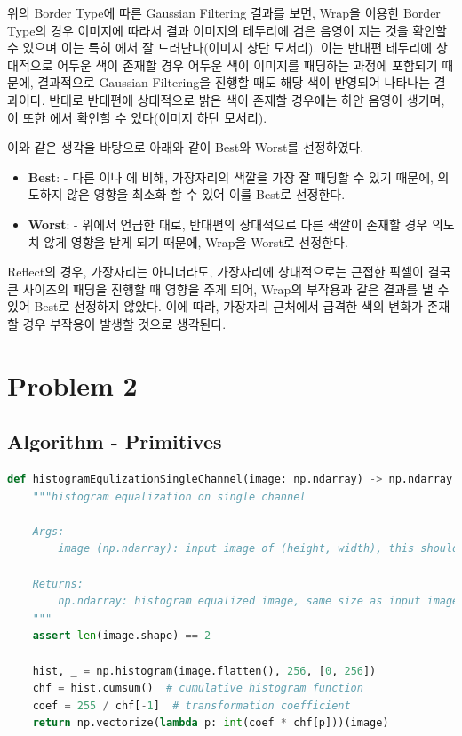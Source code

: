 \documentclass{report}
\begin{document}
위의 Border Type에 따른 Gaussian Filtering 결과를 보면, Wrap을 이용한 Border Type의 경우 이미지에 따라서 결과 이미지의 테두리에 검은 음영이 지는 것을 확인할 수 있으며 이는 특히 에서 잘 드러난다(이미지 상단 모서리).
이는 반대편 테두리에 상대적으로 어두운 색이 존재할 경우 어두운 색이 이미지를 패딩하는 과정에 포함되기 때문에, 결과적으로 Gaussian Filtering을 진행할 때도 해당 색이 반영되어 나타나는 결과이다.
반대로 반대편에 상대적으로 밝은 색이 존재할 경우에는 하얀 음영이 생기며, 이 또한 에서 확인할 수 있다(이미지 하단 모서리).

이와 같은 생각을 바탕으로 아래와 같이 Best와 Worst를 선정하였다.

\begin{itemize}
    \item \textbf{Best}:  - 다른 이나 에 비해, 가장자리의 색깔을 가장 잘 패딩할 수 있기 때문에, 의도하지 않은 영향을 최소화 할 수 있어 이를 Best로 선정한다.
    \item \textbf{Worst}:  - 위에서 언급한 대로, 반대편의 상대적으로 다른 색깔이 존재할 경우 의도치 않게 영향을 받게 되기 때문에, Wrap을 Worst로 선정한다.
\end{itemize}

Reflect의 경우, 가장자리는 아니더라도, 가장자리에 상대적으로는 근접한 픽셀이 결국 큰 사이즈의 패딩을 진행할 때 영향을 주게 되어, Wrap의 부작용과 같은 결과를 낼 수 있어 Best로 선정하지 않았다.
이에 따라, 가장자리 근처에서 급격한 색의 변화가 존재할 경우 부작용이 발생할 것으로 생각된다.

\newpage

\section*{Problem 2}

\subsection*{Algorithm - Primitives}

\begin{lstlisting}[language=Python, caption=Primitive - histogramEqulizationSingleChannel, firstnumber=150]
def histogramEqulizationSingleChannel(image: np.ndarray) -> np.ndarray:
    """histogram equalization on single channel

    Args:
        image (np.ndarray): input image of (height, width), this should be single channel image

    Returns:
        np.ndarray: histogram equalized image, same size as input image
    """
    assert len(image.shape) == 2

    hist, _ = np.histogram(image.flatten(), 256, [0, 256])
    chf = hist.cumsum()  # cumulative histogram function
    coef = 255 / chf[-1]  # transformation coefficient
    return np.vectorize(lambda p: int(coef * chf[p]))(image)
\end{lstlisting}
\end{document}
